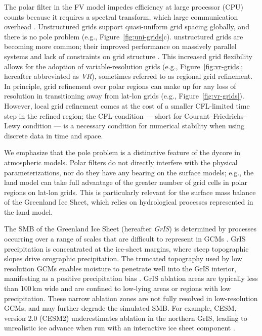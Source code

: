 \documentclass[draft]{agujournal2019}
\begin{document}
The polar filter in the FV model impedes efficiency at large processor (CPU) counts because it requires a spectral transform, which {\color{blue}{has a}} large communication overhead \cite{ST1995GEOS,DetAl2012IJHPCA}. Unstructured grids support quasi-uniform grid spacing globally, and there is no pole problem (e.g., Figure~\ref{fig:uni-grids}c). {\color{blue}{This is in part why}} unstructured grids are becoming more common; their improved performance on massively parallel systems and lack of constraints on grid structure \cite{TTI1997JCP,PL2007JCP,WETAL2013GMD}. This increased grid flexibility allows for the adoption of variable-resolution grids (e.g., Figure~\ref{fig:vr-grids}; hereafter abbreviated as \textit{VR}), sometimes referred to as regional grid refinement. In principle, grid refinement over polar regions can make up for any loss of resolution in transitioning away from lat-lon grids (e.g., Figure~\ref{fig:vr-grids}).  However, local grid refinement comes at the cost of a smaller CFL-limited time step in the refined region; the CFL-condition --- short for Courant–Friedrichs–Lewy condition --- is a necessary condition for numerical stability when using discrete data in time and space.

We emphasize that the pole problem is a distinctive feature of the dycore in atmospheric models. Polar filters do not directly interfere with the physical parameterizations, nor do they have any bearing on the surface models; e.g., the land model can take full advantage of the greater number of grid cells in polar regions on lat-lon grids. This is particularly relevant for the surface mass balance {} of the Greenland Ice Sheet, which relies on hydrological processes represented in the land model.

The SMB of the Greenland Ice Sheet (hereafter \textit{GrIS}) is determined by processes occurring over a range of scales {\color{blue}\cite{Fyke_EA_2018_Rev_Geophys}} that are difficult to represent in GCMs \cite{P2010CC}. GrIS precipitation is concentrated at the ice-sheet margins, where steep topographic slopes drive orographic precipitation. The truncated topography used by low resolution GCMs enables moisture to penetrate well into the GrIS interior, manifesting as a positive precipitation bias {\color{blue}{in the interior}} \cite{P2000GPC,VETAL2018TC}. GrIS ablation areas {\color{blue}{(marginal regions where the annual SMB is negative)}} are typically less than 100\,km wide and are confined to low-lying areas or regions with low precipitation. These narrow ablation zones are not fully resolved in low-resolution GCMs, and may further degrade the simulated SMB. {} For example, CESM, version 2.0 (CESM2) underestimates ablation in the northern GrIS, leading to unrealistic ice advance when run with an interactive ice sheet component \cite{LETAL2020JAMES}.
\end{document}
